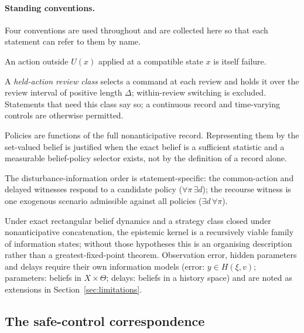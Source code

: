\documentclass[11pt,a4paper]{article}
\theoremstyle{plain}
\theoremstyle{definition}
\theoremstyle{remark}
\newcommand{\hyp}[1]{\textup{(#1)}}
\begin{document}
\paragraph{Standing conventions.} Four conventions are used throughout and are collected here so that each statement can refer to them by name.
\begin{description}[leftmargin=1.6em,itemsep=1pt]
\item[\hyp{Fail}] An action outside $U(x)$ applied at a compatible state $x$ is itself failure.
\item[\hyp{Hold}] A \emph{held-action review class} selects a command at each review and holds it over the review interval of positive length $\Delta$; within-review switching is excluded. Statements that need this class say so; a continuous record and time-varying controls are otherwise permitted.
\item[\hyp{Record}] Policies are functions of the full nonanticipative record. Representing them by the set-valued belief is justified when the exact belief is a sufficient statistic and a measurable belief-policy selector exists, not by the definition of a record alone.
\item[\hyp{Order}] The disturbance-information order is statement-specific: the common-action and delayed witnesses respond to a candidate policy ($\forall\pi\,\exists d$); the recourse witness is one exogenous scenario admissible against all policies ($\exists d\,\forall\pi$).
\end{description}
Under exact rectangular belief dynamics and a strategy class closed under nonanticipative concatenation, the epistemic kernel is a recursively viable family of information states; without those hypotheses this is an organising description rather than a greatest-fixed-point theorem. Observation error, hidden parameters and delays require their own information models (error: $y\in H(\xi,v)$; parameters: beliefs in $X\times\Theta$; delays: beliefs in a history space) and are noted as extensions in Section~\ref{sec:limitations}.

\subsection{The safe-control correspondence}\label{sec:safecontrol}
\end{document}

